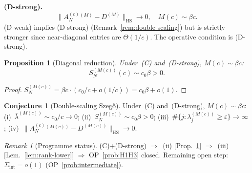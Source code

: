 \documentclass[12pt,a4paper]{amsart}
\newtheorem{proposition}[theorem]{Proposition}
\theoremstyle{definition}
\newtheorem{conjecture}[theorem]{Conjecture}
\theoremstyle{remark}
\newtheorem{remark}[theorem]{Remark}
\newcommand{\Ac}{A_N^{(c)}}
\begin{document}
\noindent\textbf{(D-strong).}
\begin{equation}\label{eq:HS-diag}
  \|\Ac^{(M)}-D^{(M)}\|_{\mathrm{HS}}
  \to 0,
  \quad M(c)\sim\beta c.
\end{equation}
(D-weak) implies (D-strong)
(Remark~\ref{rem:double-scaling})
but is strictly stronger since
near-diagonal entries are $\Theta(1/c)$.
The operative condition is (D-strong).

\begin{proposition}[Diagonal reduction]
\label{prop:HS-reduction}
Under~(C) and~(D-strong),
$M(c)\sim\beta c$:
\[
  S_N^{(M(c))}(c)\sim c_0\beta > 0.
\]
\end{proposition}
\begin{proof}
$S_N^{(M(c))}
=\beta c\cdot(c_0/c+o(1/c))
=c_0\beta+o(1)$.
\end{proof}

\begin{conjecture}[Double-scaling
  Szeg\H{o}]
\label{conj:szego}
Under~(C) and~(D-strong),
$M(c)\sim\beta c$:
\textup{(i)}~$\bar\lambda^{(M(c))}
\sim c_0/c\to 0$;
\textup{(ii)}~$S_N^{(M(c))}
\sim c_0\beta>0$;
\textup{(iii)}~$\#\{j:
\lambda_j^{(M(c))}\ge\varepsilon\}
\to\infty$;
\textup{(iv)}~$\|\Ac^{(M(c))}
-D^{(M(c))}\|_{\mathrm{HS}}\to 0$.
\end{conjecture}

\begin{remark}[Programme status]
\label{rem:programme-status}
(C)+(D-strong)
$\Rightarrow$~(ii)
[Prop.~\ref{prop:HS-reduction}]
$\Rightarrow$~(iii)
[Lem.~\ref{lem:rank-lower}]
$\Rightarrow$ OP~\ref{prob:H1H3}
closed.
Remaining open step:
$\Sigma_{\mathrm{int}}=o(1)$
(OP~\ref{prob:intermediate}).
\end{remark}
\end{document}
